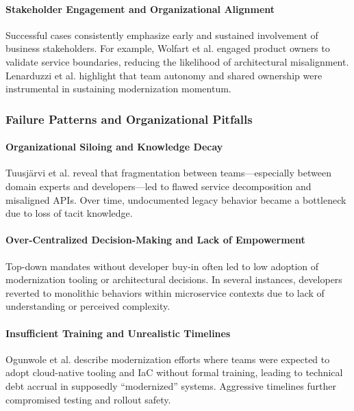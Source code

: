 \documentclass[12pt]{article}
\begin{document}
\paragraph{Stakeholder Engagement and Organizational Alignment}

Successful cases consistently emphasize early and sustained involvement of business stakeholders. For example, Wolfart et al. engaged product owners to validate service boundaries, reducing the likelihood of architectural misalignment. Lenarduzzi et al. highlight that team autonomy and shared ownership were instrumental in sustaining modernization momentum.

\vspace{0.5cm}
\subsubsection{Failure Patterns and Organizational Pitfalls}

\paragraph{Organizational Siloing and Knowledge Decay}

Tuusjärvi et al. \cite{tuusjarvi2024} reveal that fragmentation between teams—especially between domain experts and developers—led to flawed service decomposition and misaligned APIs. Over time, undocumented legacy behavior became a bottleneck due to loss of tacit knowledge.

\paragraph{Over-Centralized Decision-Making and Lack of Empowerment}

Top-down mandates without developer buy-in often led to low adoption of modernization tooling or architectural decisions. In several instances, developers reverted to monolithic behaviors within microservice contexts due to lack of understanding or perceived complexity.

\paragraph{Insufficient Training and Unrealistic Timelines}

Ogunwole et al. \cite{ogunwole2023} describe modernization efforts where teams were expected to adopt cloud-native tooling and IaC without formal training, leading to technical debt accrual in supposedly “modernized” systems. Aggressive timelines further compromised testing and rollout safety.
\end{document}
